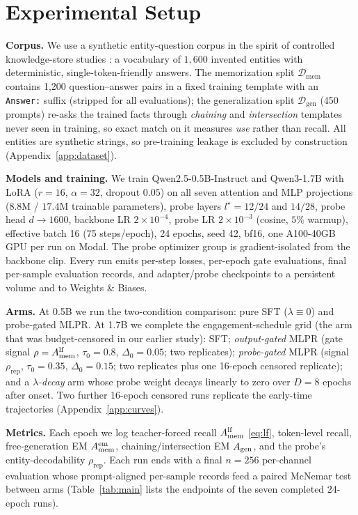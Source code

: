 \section{Experimental Setup}
\label{sec:setup}

\textbf{Corpus.} We use a synthetic entity-question corpus in the spirit
of controlled knowledge-store studies \citep{allen2023physics}: a
vocabulary of $1{,}600$ invented entities with deterministic,
single-token-friendly answers. The memorization split
$\mathcal{D}_{\mathrm{mem}}$ contains 1{,}200 question--answer pairs in
a fixed training template with an \texttt{Answer:} suffix (stripped for
all evaluations); the generalization split $\mathcal{D}_{\mathrm{gen}}$
(450 prompts) re-asks the trained facts through \emph{chaining} and
\emph{intersection} templates never seen in training, so exact match on
it measures \emph{use} rather than recall. All entities are synthetic
strings, so pre-training leakage is excluded by construction
(Appendix~\ref{app:dataset}).

\textbf{Models and training.} We train Qwen2.5-0.5B-Instruct and
Qwen3-1.7B \citep{qwen2024qwen25,qwen3} with LoRA ($r{=}16$,
$\alpha{=}32$, dropout $0.05$) on all seven attention and MLP
projections ($8.8$M / $17.4$M trainable parameters), probe layers
$l^\star{=}12/24$ and $14/28$, probe head $d\!\to\!1600$, backbone LR
$2{\times}10^{-4}$, probe LR $2{\times}10^{-3}$ (cosine, $5\%$ warmup),
effective batch 16 (75 steps/epoch), 24 epochs, seed 42, bf16, one
A100-40GB GPU per run on Modal. The probe optimizer group is
gradient-isolated from the backbone clip. Every run emits per-step
losses, per-epoch gate evaluations, final per-sample evaluation
records, and adapter/probe checkpoints to a persistent volume and to
Weights \& Biases.

\textbf{Arms.} At 0.5B we run the two-condition comparison: pure SFT
($\lambda\equiv 0$) and probe-gated MLPR. At 1.7B we complete the
engagement-schedule grid (the arm that was budget-censored in our
earlier study): SFT; \emph{output-gated} MLPR (gate signal
$\rho=A_{\mathrm{mem}}^{\mathrm{lf}}$, $\tau_0{=}0.8$, $\Delta_0{=}0.05$; two replicates);
\emph{probe-gated} MLPR (signal $\rho_{\mathrm{rep}}$,
$\tau_0{=}0.35$, $\Delta_0{=}0.15$; two replicates plus one 16-epoch
censored replicate); and a \emph{$\lambda$-decay} arm whose probe
weight decays linearly to zero over $D{=}8$ epochs after onset. Two
further 16-epoch censored runs replicate the early-time trajectories
(Appendix~\ref{app:curves}).

\textbf{Metrics.} Each epoch we log teacher-forced recall $A_{\mathrm{mem}}^{\mathrm{lf}}$
\eqref{eq:lf}, token-level recall, free-generation EM $A_{\mathrm{mem}}^{\mathrm{em}}$,
chaining/intersection EM $A_{\mathrm{gen}}$, and the probe's entity-decodability
$\rho_{\mathrm{rep}}$. Each run ends with a final $n{=}256$
per-channel evaluation whose prompt-aligned per-sample records feed a
paired McNemar test \citep{mcnemar1947} between arms
(Table~\ref{tab:main} lists the endpoints of the seven completed
24-epoch runs).

